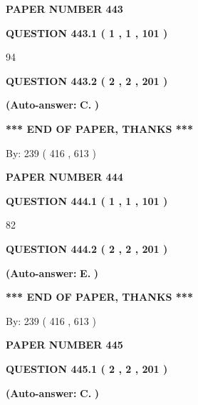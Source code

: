 \documentclass[12pt]{article}
\begin{document}
   
\newpage 
\setcounter{page}{ 
   443001 } 
   
   
 {\textbf{ \Large{ PAPER NUMBER  443  }}}
   
   
   
   
  
  
{\textbf{\large{QUESTION
443.1 
 ( 1 , 1 , 101 )
}}}

94
  
  
{\textbf{\large{QUESTION
443.2 
 ( 2 , 2 , 201 )
}}}
 
 
{\textbf{(Auto-answer:}}
{\textbf{\large{
C.}}}
{\textbf{)}}
 
 
   
   
   
   
\vspace{1.0in} 
{\textbf{\large{ *** END OF PAPER, THANKS *** }}} 
   
   
\hspace{1.0in} By: 
 239 ( 416 ,  613 )
   
   
   
   
\newpage 
\setcounter{page}{ 
   444001 } 
   
   
 {\textbf{ \Large{ PAPER NUMBER  444  }}}
   
   
   
   
  
  
{\textbf{\large{QUESTION
444.1 
 ( 1 , 1 , 101 )
}}}

82
  
  
{\textbf{\large{QUESTION
444.2 
 ( 2 , 2 , 201 )
}}}
 
 
{\textbf{(Auto-answer:}}
{\textbf{\large{
E.}}}
{\textbf{)}}
 
 
   
   
   
   
\vspace{1.0in} 
{\textbf{\large{ *** END OF PAPER, THANKS *** }}} 
   
   
\hspace{1.0in} By: 
 239 ( 416 ,  613 )
   
   
   
   
\newpage 
\setcounter{page}{ 
   445001 } 
   
   
 {\textbf{ \Large{ PAPER NUMBER  445  }}}
   
   
   
   
  
  
{\textbf{\large{QUESTION
445.1 
 ( 2 , 2 , 201 )
}}}
 
 
{\textbf{(Auto-answer:}}
{\textbf{\large{
C.}}}
{\textbf{)}}
 
 
  
\end{document}
